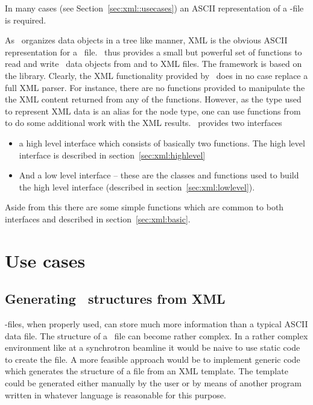 
In many cases (see Section~\ref{sec:xml::usecases}) an ASCII representation of a
\nexus-file is required. 

As \nexus\ organizes data objects in a tree like manner, XML is the obvious ASCII
representation for a \nexus\ file.
\libpniio\ thus provides a small but powerful set of functions to read and write 
\nexus\ data objects from and to XML files. The framework is based on the 
 library. Clearly, the XML functionality provided 
by \libpniio\ does in no case replace a full XML parser. For instance, there are
no functions provided to manipulate the the XML content returned from 
any of the functions. However, as the  type used to represent 
XML data is an alias for the  node type, one can use
functions from  to do some additional work with the
XML results.
\libpniio\ provides two interfaces\
\begin{itemize}
\item a high level interface which consists of basically two functions. The high
level interface is described in section~\ref{sec:xml:highlevel}
\item And a low level interface -- these are the classes and functions used to
build the high level interface (described in section~\ref{sec:xml:lowlevel}).
\end{itemize}
Aside from this there are some simple functions which are common to both
interfaces and described in section~\ref{sec:xml:basic}.

\section{Use cases}\label{sec:xml:usecases}

\subsection{Generating \nexus\ structures from XML}

\nexus-files, when properly used, can store much more information than a typical
ASCII data file.
The structure of a \nexus\ file can become rather complex. In a rather complex 
environment like at a synchrotron beamline it would be naive to use static 
code to create the file. A more feasible approach would be to implement 
generic code which generates the structure of a file from an XML template. 
The template could be generated either manually by the user or by means 
of another program written in whatever language is reasonable for this purpose. 

